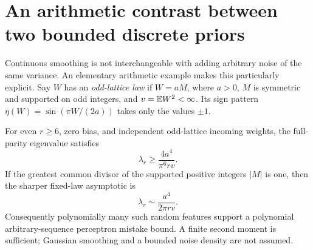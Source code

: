 \section{An arithmetic contrast between two bounded discrete priors}
Continuous smoothing is not interchangeable with adding arbitrary noise
of the same variance. An elementary arithmetic example makes this
particularly explicit. Say $W$ has an \emph{odd-lattice law} if
$W=aM$, where $a>0$, $M$ is symmetric and supported on odd integers,
and $v=\mathbb E W^2<\infty$. Its sign pattern
$\eta(W)=\sin(\pi W/(2a))$ takes only the values $\pm1$.

\begin{theorem}
For even $r\ge6$, zero bias, and independent odd-lattice incoming
weights, the full-parity eigenvalue satisfies
\[
                 \lambda_r\ge\frac{4a^4}{\pi^6 r v}.
 \tag{34}
\]
If the greatest common divisor of the supported positive integers $|M|$
is one, then the sharper fixed-law asymptotic is
\[
                 \lambda_r\sim\frac{a^4}{2\pi r v}.
 \tag{35}
\]
Consequently polynomially many such random features support a polynomial
arbitrary-sequence perceptron mistake bound. A finite second moment is
sufficient; Gaussian smoothing and a bounded noise density are not assumed.
\end{theorem}
